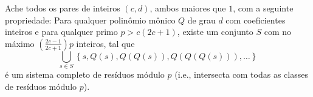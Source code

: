 Ache todos os pares de inteiros $(c, d)$, ambos maiores que $1$, com a seguinte propriedade:
Para qualquer polinômio mônico $Q$ de grau $d$ com coeficientes inteiros e para qualquer primo $p > c(2c+1)$, existe um conjunto $S$ com no máximo
$\left(\frac{2c-1}{2c+1}\right)p$ inteiros,
tal que 
$$ \bigcup_{s\in S} \left\{s, Q(s), Q(Q(s)), Q(Q(Q(s))), \dots\right\}$$
é um sistema completo de resíduos módulo $p$ (i.e., intersecta com todas as classes de resíduos módulo $p$).